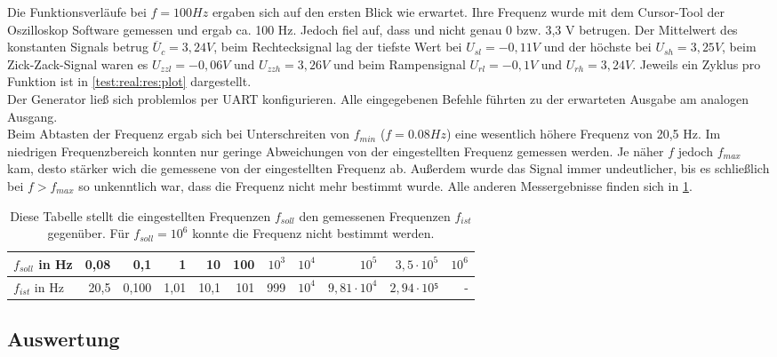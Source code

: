 Die Funktionsverläufe bei $f = 100Hz$ ergaben sich auf den ersten Blick wie erwartet.
Ihre Frequenz wurde mit dem Cursor-Tool der Oszilloskop Software gemessen und ergab ca. 100 Hz.
Jedoch fiel auf, dass  und  nicht genau 0 bzw. 3,3 V betrugen.
Der Mittelwert des konstanten Signals betrug $\overline{U}_{c}=3,24 V$, beim Rechtecksignal lag der tiefste Wert bei $U_{sl} = -0,11 V$ und der höchste bei $U_{sh} = 3,25 V$, beim Zick-Zack-Signal waren es $U_{zzl} = -0,06 V$ und $U_{zzh} = 3,26 V$ und beim Rampensignal $U_{rl} = -0,1 V$ und $U_{rh} = 3,24 V$.
Jeweils ein Zyklus pro Funktion ist in \cref{test:real:res:plot} dargestellt.\\
Der Generator ließ sich problemlos per UART konfigurieren.
Alle eingegebenen Befehle führten zu der erwarteten Ausgabe am analogen Ausgang.\\
Beim Abtasten der Frequenz  ergab sich bei Unterschreiten von $f_{min}$ ($f = 0.08Hz$) eine wesentlich höhere Frequenz von 20,5 Hz. 
Im niedrigen Frequenzbereich konnten nur geringe Abweichungen von der eingestellten Frequenz gemessen werden.
Je näher $f$ jedoch $f_{max}$ kam, desto stärker wich die gemessene von der eingestellten Frequenz ab.
Außerdem wurde das Signal immer undeutlicher, bis es schließlich bei $f > f_{max}$ so unkenntlich war, dass die Frequenz nicht mehr bestimmt wurde.
Alle anderen Messergebnisse finden sich in \cref{test:real:res:ftab}.

\begin{table}[h]
  \begin{tabular}[h]{|l|r|r|r|r|r|r|r|r|r|r|}
    \hline
    $f_{soll}$ in Hz & 0,08 & 0,1 & 1 & 10 & 100 & $10^3$ & $10^4$ & $10^5$ & $3,5 \cdot 10^5$ & $10^6$\\ \hline
    $f_{ist}$ in Hz & 20,5 & 0,100 & 1,01& 10,1 & 101 & 999 & $10^4$ & $9,81 \cdot 10^4$ & $2,94 \cdot 10⁵$ & - \\ \hline
  \end{tabular}
  \caption{Diese Tabelle stellt die eingestellten Frequenzen $f_{soll}$ den gemessenen Frequenzen $f_{ist}$ gegenüber. Für $f_{soll} = 10^6$ konnte die Frequenz nicht bestimmt werden.} \label{test:real:res:ftab}
\end{table}

\subsection{Auswertung}


